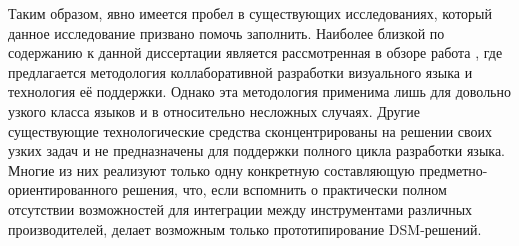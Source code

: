 Таким образом, явно имеется пробел в существующих исследованиях, который данное исследование
призвано помочь заполнить. Наиболее близкой по содержанию к данной диссертации является
рассмотренная в обзоре работа \cite{repenning1995agentsheets}, где предлагается методология
коллаборативной разработки визуального языка и технология её поддержки. Однако эта
методология применима лишь для довольно узкого класса языков и в относительно несложных
случаях. Другие существующие технологические средства сконцентрированы на решении
своих узких задач и не предназначены для поддержки полного цикла разработки языка.
Многие из них реализуют только одну конкретную составляющую предметно-ориентированного
решения, что, если вспомнить о практически полном отсутствии возможностей для интеграции
между инструментами различных производителей, делает возможным только прототипирование
\ac{DSM}-решений.
